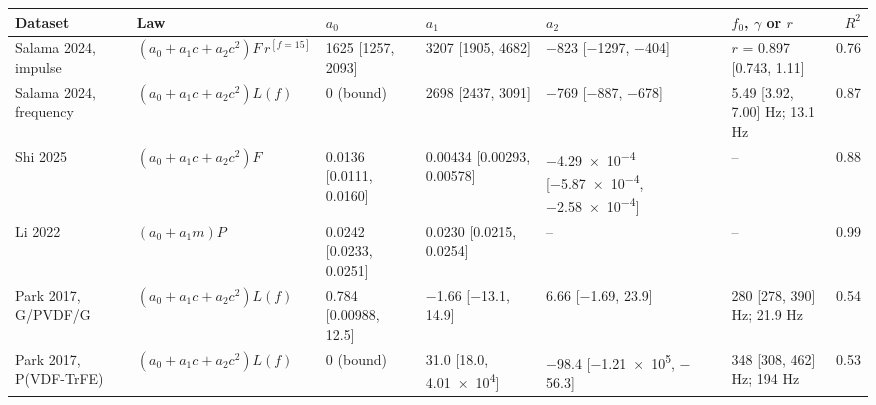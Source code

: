 \begin{tabular}{l l l l l l r}
\toprule
Dataset & Law & $a_0$ & $a_1$ & $a_2$ & $f_0$, $\gamma$ or $r$ & $R^2$ \\
\midrule
Salama 2024, impulse & $(a_0+a_1c+a_2c^2)F\,r^{[f=15]}$ & 1625 [1257, 2093] & 3207 [1905, 4682] & $-$823 [$-$1297, $-$404] & $r$ = 0.897 [0.743, 1.11] & 0.76 \\
Salama 2024, frequency & $(a_0+a_1c+a_2c^2)L(f)$ & 0 (bound) & 2698 [2437, 3091] & $-$769 [$-$887, $-$678] & 5.49 [3.92, 7.00] Hz; 13.1 Hz & 0.87 \\
Shi 2025 & $(a_0+a_1c+a_2c^2)F$ & 0.0136 [0.0111, 0.0160] & 0.00434 [0.00293, 0.00578] & \num{-4.29e-4} [\num{-5.87e-4}, \num{-2.58e-4}] & -- & 0.88 \\
Li 2022 & $(a_0+a_1m)P$ & 0.0242 [0.0233, 0.0251] & 0.0230 [0.0215, 0.0254] & -- & -- & 0.99 \\
Park 2017, G/PVDF/G & $(a_0+a_1c+a_2c^2)L(f)$ & 0.784 [0.00988, 12.5] & $-$1.66 [$-$13.1, 14.9] & 6.66 [$-$1.69, 23.9] & 280 [278, 390] Hz; 21.9 Hz & 0.54 \\
Park 2017, P(VDF-TrFE) & $(a_0+a_1c+a_2c^2)L(f)$ & 0 (bound) & 31.0 [18.0, \num{4.01e4}] & $-$98.4 [\num{-1.21e5}, $-$56.3] & 348 [308, 462] Hz; 194 Hz & 0.53 \\
\bottomrule
\end{tabular}
